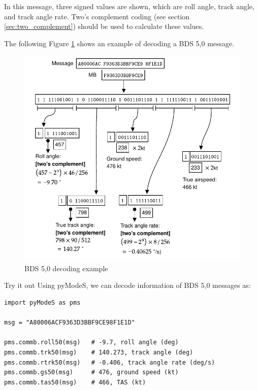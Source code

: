 In this message, three signed values are shown, which are roll angle, track angle, and track angle rate. Two's complement coding (see section \ref{sec:two_complement}) should be used to calculate these values. 

The following Figure \ref{fig:bds50_example} shows an example of decoding a BDS 5,0 message.

\begin{figure}[ht]
  \centering
  \includegraphics[scale=0.9]{figures/mode_s/bds50_example.pdf}
  \caption{BDS 5,0 decoding example}
  \label{fig:bds50_example}
\end{figure}

\begin{notebox}{Try it out}
Using pyModeS, we can decode information of BDS 5,0 messages as: 

\begin{verbatim}
import pyModeS as pms

msg = "A80006ACF9363D3BBF9CE98F1E1D"

pms.commb.roll50(msg)   # -9.7, roll angle (deg)
pms.commb.trk50(msg)    # 140.273, track angle (deg)
pms.commb.rtrk50(msg)   # -0.406, track angle rate (deg/s)
pms.commb.gs50(msg)     # 476, ground speed (kt)
pms.commb.tas50(msg)    # 466, TAS (kt)

\end{verbatim}

\end{notebox}


